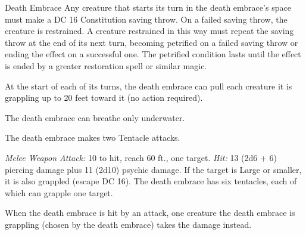 \documentclass[10pt,a4paper,twoside,bg=print,twocolumn,openany,nodeprecatedcode]{dndbook}
\begin{document}
\begin{DndMonster}[float=t]{Death Embrace}
\DndMonsterBasics[
armor-class = {13 (natural armor)},
hit-points = {\DndDice{14d12 + 56}},
speed = {0 ft., swim 20 ft.}
]
\DndMonsterAbilityScores[
 str = 23,
 dex = 15,
 con = 19,
 int = 6,
 wis = 9,
 cha = 4
]
\DndMonsterDetails[
saving-throws = {Str +10, Wis +3},
condition-immunities = {exhaustion, paralyzed, petrified, prone},
senses = {blindsight 60 ft. (blind beyond this radius), passive perception 9},
challenge = 11,
]
Any creature that starts its turn in the death embrace's space must make a DC 16 Constitution saving throw. On a failed saving throw, the creature is restrained. A creature restrained in this way must repeat the saving throw at the end of its next turn, becoming petrified on a failed saving throw or ending the effect on a successful one. The petrified condition lasts until the effect is ended by a greater restoration spell or similar magic.

At the start of each of its turns, the death embrace can pull each creature it is grappling up to 20 feet toward it (no action required).

The death embrace can breathe only underwater.

The death embrace makes two Tentacle attacks.

\textsl{Melee Weapon Attack:} 10 to hit, reach 60 ft., one target. \textsl{Hit:} 13 (2d6 + 6) piercing damage plus 11 (2d10) psychic damage. If the target is Large or smaller, it is also grappled (escape DC 16). The death embrace has six tentacles, each of which can grapple one target.

When the death embrace is hit by an attack, one creature the death embrace is grappling (chosen by the death embrace) takes the damage instead.

\end{DndMonster}
\end{document}
